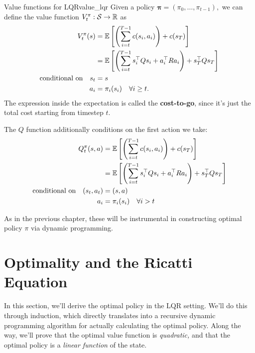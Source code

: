 \documentclass[../main/main]{subfiles}
\begin{document}
\begin{definition}{Value functions for LQR}{value_lqr}
    Given a policy $\mathbf{\pi} = (\pi_0, \dots, \pi_{t-1}),$ we can define the
    value function $V^\pi_t : \mathcal{S} \to \mathbb{R}$ as \[ \begin{split}
        V^\pi_t (s) &= \operatorname*{\mathbb{E}} \left[ \left( \sum_{i=t}^{T-1} c(s_i, a_i) \right) + c(s_T) \right] \\
        &= \operatorname*{\mathbb{E}} \left[ \left( \sum_{i=t}^{T-1} s_i^\top Q s_i + a_i^\top R a_i \right) + s_T^\top Q s_T \right] \\
        \textrm{conditional on} \quad s_t &= s \\
        a_i &= \pi_i(s_i) \quad \forall i \ge t.
    \end{split} \]
    The expression inside the expectation is called the \textbf{cost-to-go},
    since it's just the total cost starting from timestep $t$.

    The $Q$ function additionally conditions on the first
    action we take: \[ \begin{split}
        Q^\pi_t (s, a) &= \operatorname*{\mathbb{E}} \left[ \left( \sum_{i=t}^{T-1} c(s_i, a_i) \right) + c(s_T) \right] \\
        &= \operatorname*{\mathbb{E}} \left[ \left( \sum_{i=t}^{T-1} s_i^\top Q s_i + a_i^\top R a_i \right) + s_T^\top Q s_T \right] \\
        \textrm{conditional on} \quad (s_t, a_t) &= (s, a) \\
        \quad a_i &= \pi_i(s_i) \quad \forall i > t
    \end{split} \]
\end{definition}

As in the previous chapter, these will be instrumental in constructing optimal policy $\pi$ via dynamic
programming.

\section{Optimality and the Ricatti Equation} \label{sec:optimal_lqr}

In this section, we'll derive the optimal policy in the LQR setting.
We'll do this through induction, which directly translates into a recursive dynamic programming algorithm for actually calculating the optimal policy.
Along the way, we'll prove that the optimal value function is \emph{quadratic,}
and that the optimal policy is a \emph{linear function} of the state.
\end{document}
